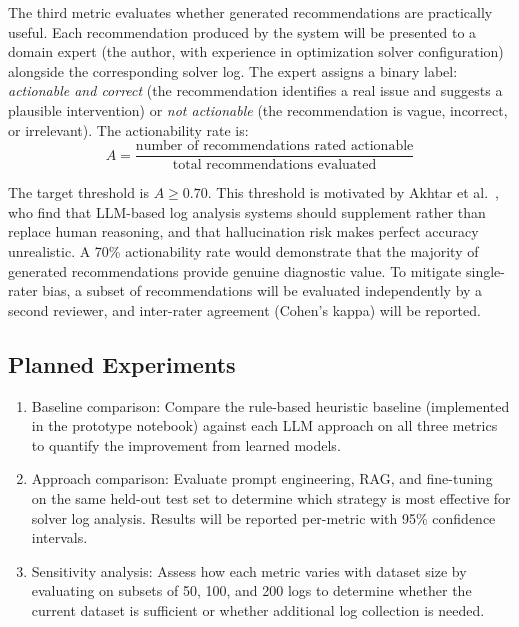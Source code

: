 \documentclass[11pt]{article}
\begin{document}
The third metric evaluates whether generated recommendations are practically useful. Each recommendation produced by the system will be presented to a domain expert (the author, with experience in optimization solver configuration) alongside the corresponding solver log. The expert assigns a binary label: \emph{actionable and correct} (the recommendation identifies a real issue and suggests a plausible intervention) or \emph{not actionable} (the recommendation is vague, incorrect, or irrelevant). The actionability rate is:
\begin{equation}
    A = \frac{\text{number of recommendations rated actionable}}{\text{total recommendations evaluated}}
\end{equation}

The target threshold is $A \geq 0.70$. This threshold is motivated by Akhtar et al.\ \cite{akhtar2025llmbasedeventloganalysis}, who find that LLM-based log analysis systems should supplement rather than replace human reasoning, and that hallucination risk makes perfect accuracy unrealistic. A 70\% actionability rate would demonstrate that the majority of generated recommendations provide genuine diagnostic value. To mitigate single-rater bias, a subset of recommendations will be evaluated independently by a second reviewer, and inter-rater agreement (Cohen's kappa) will be reported.

\subsection{Planned Experiments}

\begin{enumerate}
    \item Baseline comparison: Compare the rule-based heuristic baseline (implemented in the prototype notebook) against each LLM approach on all three metrics to quantify the improvement from learned models.
    \item Approach comparison: Evaluate prompt engineering, RAG, and fine-tuning on the same held-out test set to determine which strategy is most effective for solver log analysis. Results will be reported per-metric with 95\% confidence intervals.
    \item Sensitivity analysis: Assess how each metric varies with dataset size by evaluating on subsets of 50, 100, and 200 logs to determine whether the current dataset is sufficient or whether additional log collection is needed.
\end{enumerate}
\end{document}
